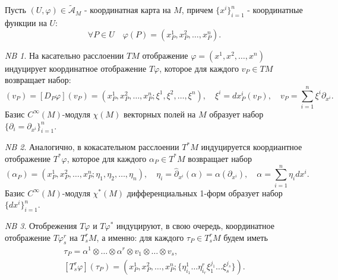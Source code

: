 \documentclass[12pt]{article}
\theoremstyle{plain}
\theoremstyle{lemma}
\theoremstyle{corollary}
\theoremstyle{proposition}
\theoremstyle{exercise}
\theoremstyle{example}
\theoremstyle{remark}
\newtheorem{remark}{NB}
\theoremstyle{definition}
\newcommand\tld{\widetilde}
\begin{document}
Пусть $(U,\varphi) \in \tld{\mathcal{A}}_M$ - координатная карта на $M$, 
причем $\{x^i\}_{i=1}^n$ - координатные функции на $U$:
\begin{equation*}
    \forall P \in U \quad \varphi(P) = (x_P^1, x_P^2, \ldots, x_P^n).
\end{equation*}

\begin{remark}
    На касательно расслоении $TM$ отображение $\varphi = (x^1, x^2, \ldots, x^n)$
    индуцирует координатное отображение $T\varphi$, которое для каждого 
    $v_P \in TM$ возвращает набор: 
    \begin{equation*}
        [T\varphi](v_P) = [D_P \varphi](v_P) = (x^1_P, x^2_P, \ldots, x^n_P; \xi^1, \xi^2, \ldots, \xi^n), \quad 
        \xi^i = dx_P^i(v_P), \quad 
        v_P = \sum_{i=1}^n \xi^i \partial_{x^i}.
    \end{equation*}
    Базис $C^\infty(M)$-модуля $\chi(M)$ векторных полей на $M$ образует набор 
    $\{\partial_i = \partial_{x^i}\}_{i=1}^n$.
\end{remark}

\begin{remark}
    Аналогично, в кокасательном расслоении $T^\ast M$ индуцируется коордиантное отображение 
    $T^\ast \varphi$, которое для каждого $\alpha_P \in T^\ast M$ возвращает набор
    \begin{equation*}
        [T^\ast\varphi](\alpha_P) = (x^1_P, x^2_P, \ldots, x^n_P; \eta_1, \eta_2, \ldots, \eta_n), \quad 
        \eta_i = \widehat{\partial}_{x^i}(\alpha) = \alpha(\partial_{x^i}), \quad 
        \alpha = \sum_{i=1}^{n} \eta_i dx^i.
    \end{equation*}
    Базис $C^\infty(M)$-модуля $\chi^\ast(M)$ дифференциальных 1-форм образует набор $\{dx^i\}_{i=1}^n$.
\end{remark}

\begin{remark}
    Отобрежения $T\varphi$ и $T\varphi^\ast$ индуцируют, в свою очередь, координатное 
    отображение $T\varphi^r_s$ на $T^r_sM$, а именно: для каждого $\tau_P \in T^r_sM$
    будем иметь 
    \begin{gather*}
        \tau_P = \alpha^1 \otimes \ldots \otimes \alpha^r \otimes v_1 \otimes \ldots \otimes v_s, \\
        [T^r_s\varphi](\tau_P) = (x^1_P, x^2_P, \ldots, x^n_P; \{\eta^1_{i_1}\ldots\eta^r_{i_r}\xi^{j_1}_1 \ldots \xi^{j_s}_s\}).
    \end{gather*}
\end{remark}
\end{document}
